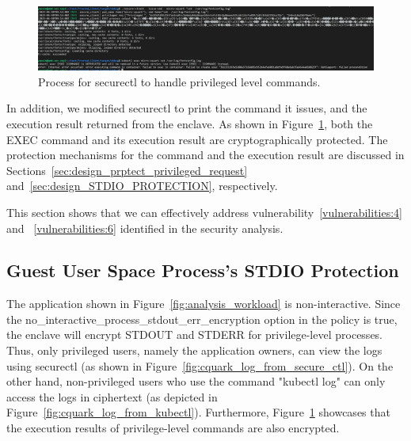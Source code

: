 \begin{figure}[!htb]
    \centering
    \includegraphics[width=1\textwidth]{images/cquark_priviled_cmd_result_protection.PNG}
    \caption[Process for securectl to handle privileged level commands]{Process for securectl to handle privileged level commands.}
    \label{fig:cquark_priviled_cmd_result_protection}
\end{figure}


In addition, we modified securectl to print the command it issues, and the execution result returned from the enclave. As shown in Figure~\ref{fig:cquark_priviled_cmd_result_protection}, both the EXEC command and its execution result are cryptographically protected. The protection mechanisms for the command and the execution result are 
discussed in Sections~\ref{sec:design_prptect_privileged_request} and~\ref{sec:design_STDIO_PROTECTION}, respectively.


This section shows that we can effectively address vulnerability~\ref{vulnerabilities:4} and ~\ref{vulnerabilities:6} identified in the security analysis.



\subsection{Guest User Space Process's STDIO Protection}
The application shown in Figure~\ref{fig:analysis_workload} is non-interactive. Since the no\_interactive\_process\_stdout\_err\_encryption option in the policy is true, the enclave will encrypt STDOUT and STDERR for privilege-level processes. Thus, only privileged users, namely the application owners, can view the logs using securectl (as shown in Figure~\ref{fig:cquark_log_from_secure_ctl}). On the other hand, non-privileged users who use the command 
"kubectl log" can only access the logs in ciphertext (as depicted in Figure~\ref{fig:cquark_log_from_kubectl}). Furthermore, Figure~\ref{fig:cquark_priviled_cmd_result_protection} showcases that the execution results of privilege-level commands are also encrypted.

